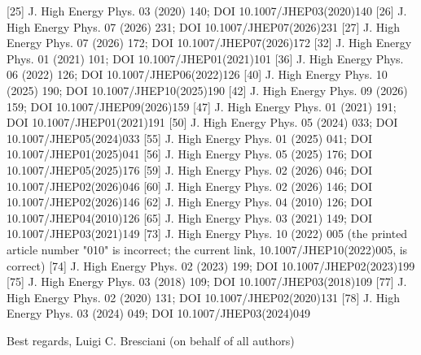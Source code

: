 [25] J. High Energy Phys. 03 (2020) 140; DOI 10.1007/JHEP03(2020)140
[26] J. High Energy Phys. 07 (2026) 231; DOI 10.1007/JHEP07(2026)231
[27] J. High Energy Phys. 07 (2026) 172; DOI 10.1007/JHEP07(2026)172
[32] J. High Energy Phys. 01 (2021) 101; DOI 10.1007/JHEP01(2021)101
[36] J. High Energy Phys. 06 (2022) 126; DOI 10.1007/JHEP06(2022)126
[40] J. High Energy Phys. 10 (2025) 190; DOI 10.1007/JHEP10(2025)190
[42] J. High Energy Phys. 09 (2026) 159; DOI 10.1007/JHEP09(2026)159
[47] J. High Energy Phys. 01 (2021) 191; DOI 10.1007/JHEP01(2021)191
[50] J. High Energy Phys. 05 (2024) 033; DOI 10.1007/JHEP05(2024)033
[55] J. High Energy Phys. 01 (2025) 041; DOI 10.1007/JHEP01(2025)041
[56] J. High Energy Phys. 05 (2025) 176; DOI 10.1007/JHEP05(2025)176
[59] J. High Energy Phys. 02 (2026) 046; DOI 10.1007/JHEP02(2026)046
[60] J. High Energy Phys. 02 (2026) 146; DOI 10.1007/JHEP02(2026)146
[62] J. High Energy Phys. 04 (2010) 126; DOI 10.1007/JHEP04(2010)126
[65] J. High Energy Phys. 03 (2021) 149; DOI 10.1007/JHEP03(2021)149
[73] J. High Energy Phys. 10 (2022) 005
     (the printed article number "010" is incorrect; the current link,
     10.1007/JHEP10(2022)005, is correct)
[74] J. High Energy Phys. 02 (2023) 199; DOI 10.1007/JHEP02(2023)199
[75] J. High Energy Phys. 03 (2018) 109; DOI 10.1007/JHEP03(2018)109
[77] J. High Energy Phys. 02 (2020) 131; DOI 10.1007/JHEP02(2020)131
[78] J. High Energy Phys. 03 (2024) 049; DOI 10.1007/JHEP03(2024)049



Best regards,
Luigi C. Bresciani
(on behalf of all authors)
